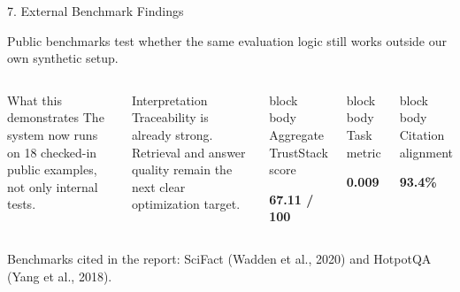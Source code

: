 \documentclass[aspectratio=169,11pt]{beamer}
\newcommand{\slidelead}[1]{%
  {\color{tsmuted}\footnotesize #1\par}
  \vspace{0.35em}
}
\newcommand{\statcard}[2]{%
  \begin{beamercolorbox}[wd=\linewidth,rounded=true,shadow=true,sep=0.18cm]{block body}
    {\scriptsize\textcolor{tsmuted}{#1}}\par
    \vspace{0.22em}
    {\large\bfseries #2}
  \end{beamercolorbox}
}
\begin{document}
\begin{frame}{7. External Benchmark Findings}
  \slidelead{Public benchmarks test whether the same evaluation logic still works outside our own synthetic setup.}
  \begin{columns}[T,totalwidth=\textwidth]
    \begin{block}{What this demonstrates}
      The system now runs on 18 checked-in public examples, not only internal tests.
    \end{block}
    \begin{block}{Interpretation}
      Traceability is already strong. Retrieval and answer quality remain the next clear optimization target.
    \end{block}
    \statcard{Aggregate TrustStack score}{67.11 / 100}
    \vspace{0.45em}
    \statcard{Task metric}{0.009}
    \vspace{0.45em}
    \statcard{Citation alignment}{93.4\%}
  \end{columns}
\vspace{0.25em}
{\scriptsize\color{tsmuted}Benchmarks cited in the report: SciFact (Wadden et al., 2020) and HotpotQA (Yang et al., 2018).}
\end{frame}
\end{document}
